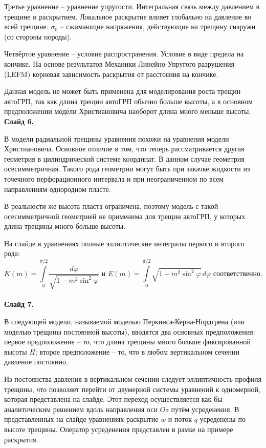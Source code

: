 \documentclass[a4paper, 12pt]{article}
\begin{document}
Третье уравнение -- уравнение упругости.
Интегральная связь между давлением в трещине и раскрытием.
Локальное раскрытие влияет глобально на давление во всей трещине.
$\sigma_0$ -- сжимающие напряжения, действующие на трещину снаружи (со стороны породы).

Четвёртое уравнение -- условие распространения.
Условие в виде предела на кончике.
На основе результатов Механики Линейно-Упругого разрушения (LEFM) корневая зависимость раскрытия от расстояния на кончике.

Данная модель не может быть применена для моделирования роста трещин автоГРП, так как длина трещин автоГРП обычно больше высоты, а в основном предположении модели Христиановича наоборот длина много меньше высоты.\\

\textbf{Слайд 6.}

В модели радиальной трещины уравнения похожи на уравнения модели Христиановича.
Основное отличие в том, что теперь рассматривается другая геометрия в цилиндрической системе координат.
В данном случае геометрия осесимметричная.
Такого рода геометрии могут быть при закачке жидкости из точечного перфорационного интервала и при неограниченном по всем направлениям однородном пласте.

В реальности же высота пласта ограничена, поэтому модель с такой осесимметричной геометрией не применима для трещин автоГРП, у которых длина трещины много больше высоты.

На слайде в уравнениях полные эллиптические интегралы первого и второго рода:
$$K(m)=\int\limits_{0}^{\pi/2}{\frac{d\varphi}{\sqrt{1-m^2\sin^2{\!\varphi}}}}\text{ и } E(m)=\int\limits_{0}^{\pi/2}{\sqrt{1-m^2\sin^2{\!\varphi}}\,d\varphi}\text{ соответственно.}$$\\

\textbf{Слайд 7.}

В следующей модели, называемой моделью Перкинса-Керна-Нордгрена (или моделью трещины постоянной высоты), вводятся два основных предположения: первое предположение -- то, что длина трещины много больше фиксированной высоты $H$; второе предположение -- то, что в любом вертикальном сечении давление постоянно.

Из постоянства давления в вертикальном сечении следует эллиптичность профиля трещины, что позволяет перейти от двумерной системы уравнений к одномерной, которая представлена на слайде.
Этот переход осуществляется как бы аналитическим решением вдоль направления оси $Oz$ путём усреденения.
В представленных на слайде уравнениях раскрытие $w$ и поток $q$ усреденены по высоте трещины.
Оператор усреденения представлен в рамке на примере раскрытия.
\end{document}
